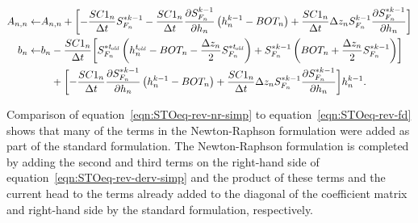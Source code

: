 \begin{equation}
	\label{eqn:STOeq-rev-nr-simp}
	\begin{aligned}
		A_{n,n} \leftarrow & A_{n,n} + \biggl[ -\frac{SC1_n}{\Delta t}  S_{F_n}^{\ast k-1} - \frac{SC1_n}{\Delta t} \frac{\partial S_{F_n}^{k-1}}{\partial h_n} \left( h_n^{k-1} - BOT_n \right) + \frac{SC1_n}{\Delta t} \Delta z_n S_{F_n}^{k-1}  \frac{\partial S_{F_n}^{\ast k-1}}{\partial h_n} \biggr]  \\
		b_n \leftarrow & b_n - \frac{SC1_n}{\Delta t} \biggl[ S_{F_n}^{\ast t_\mathit{\kern -0.07em old}} \left( h_n^{t_\mathit{\kern -0.07em old}} - BOT_n - \frac{\Delta z_n}{2} S_{F_n}^{\ast t_\mathit{\kern -0.07em old}} \right) + S_{F_n}^{\ast k-1} \left( BOT_n + \frac{\Delta z_n}{2} S_{F_n}^{\ast k-1} \right) \biggr] \\
		& \phantom{b_n} + \biggl[ - \frac{SC1_n}{\Delta t} \frac{\partial S_{F_n}^{\ast k-1}}{\partial h_n} \left( h_n^{k-1} - BOT_n \right) + \frac{SC1_n}{\Delta t} \Delta z_n S_{F_n}^{\ast k-1}  \frac{\partial S_{F_n}^{\ast k-1}}{\partial h_n} \biggr]  h_n^{k-1} .
	\end{aligned}
\end{equation} 

\noindent Comparison of equation~\ref{eqn:STOeq-rev-nr-simp} to equation~\ref{eqn:STOeq-rev-fd} shows that many of the terms in the Newton-Raphson formulation were added as part of the standard formulation. The Newton-Raphson formulation is completed by adding the second and third terms on the right-hand side of equation~\ref{eqn:STOeq-rev-derv-simp} and the product of these terms and the current head to the terms already added to the diagonal of the coefficient matrix and right-hand side by the standard formulation, respectively.
